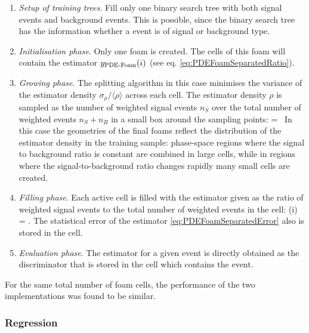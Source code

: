 \begin{enumerate}
  \item \emph{Setup of training trees}. Fill only one binary search
    tree with both signal events and background events.  This is
    possible, since the binary search tree has the information whether
    a event is of signal or background type.
    
  \item \emph{Initialisation phase}. Only one foam is created. The
    cells of this foam will contain the estimator $ y_\text{\mbox{PDE-Foam}}(i)$ (see
    eq. \eqref{eq:PDEFoamSeparatedRatio}).

  \item \emph{Growing phase}. The splitting algorithm in this case
    minimises the variance of the estimator density
    $\sigma_{\rho}/\langle \rho\rangle$ across each cell.  The
    estimator density $\rho$ is sampled as the number of weighted signal events
    $n_S$ over the total number of weighted events
    $n_S+n_B$ in a small box around the sampling
    points:
    \beq
    \rho =  \, 
    \eeq
    In this case the geometries of the final foams reflect 
    the distribution of the estimator density in the training sample:
    phase-space regions where the signal to background ratio
    is constant are combined in large cells, while in regions where
    the signal-to-background ratio changes rapidly many small
    cells are created. 

  \item \emph{Filling phase}. Each active cell is filled with the estimator
    given as the ratio of weighted signal events to the total number of 
    weighted events
    in the cell:
    \beq
    \RPDEFoam(i) = .
    \eeq
    The statistical error of the estimator \eqref{eq:PDEFoamSeparatedError}
    also is stored in the cell.

  \item \emph{Evaluation phase}. The estimator for a given event is
    directly obtained as the discriminator that is stored in the cell
    which contains the event. 

\end{enumerate}

For the same total number of foam cells, the performance of the
two implementations was found to be similar. 

\subsubsection{Regression}

